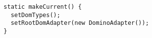 \begin{verbatim}
  static makeCurrent() {
    setDomTypes();
    setRootDomAdapter(new DominoAdapter());
  }
\end{verbatim}
